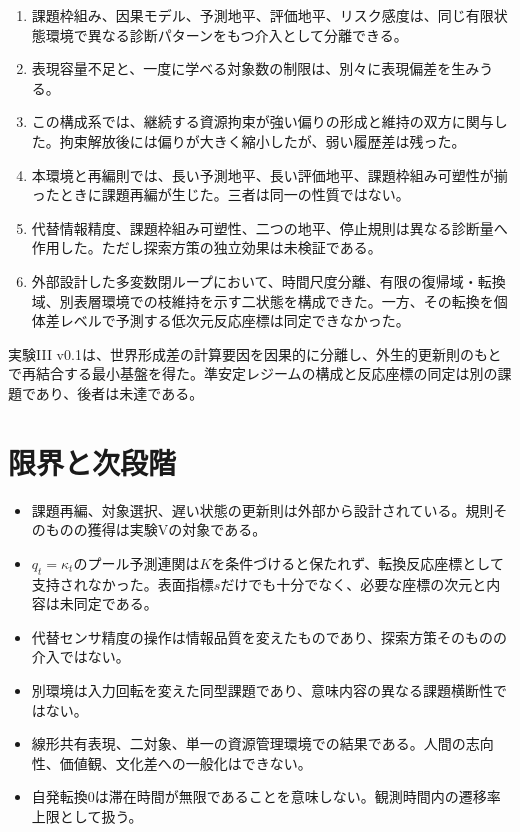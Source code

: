 \documentclass[11pt,a4paper]{ltjsarticle}
\begin{document}
\begin{enumerate}
\item 課題枠組み、因果モデル、予測地平、評価地平、リスク感度は、同じ有限状態環境で異なる診断パターンをもつ介入として分離できる。
\item 表現容量不足と、一度に学べる対象数の制限は、別々に表現偏差を生みうる。
\item この構成系では、継続する資源拘束が強い偏りの形成と維持の双方に関与した。拘束解放後には偏りが大きく縮小したが、弱い履歴差は残った。
\item 本環境と再編則では、長い予測地平、長い評価地平、課題枠組み可塑性が揃ったときに課題再編が生じた。三者は同一の性質ではない。
\item 代替情報精度、課題枠組み可塑性、二つの地平、停止規則は異なる診断量へ作用した。ただし探索方策の独立効果は未検証である。
\item 外部設計した多変数閉ループにおいて、時間尺度分離、有限の復帰域・転換域、別表層環境での枝維持を示す二状態を構成できた。一方、その転換を個体差レベルで予測する低次元反応座標は同定できなかった。
\end{enumerate}

\enlargethispage{2\baselineskip}
実験III v0.1は、世界形成差の計算要因を因果的に分離し、外生的更新則のもとで再結合する最小基盤を得た。準安定レジームの構成と反応座標の同定は別の課題であり、後者は未達である。

\section{限界と次段階}

\begin{itemize}
\item 課題再編、対象選択、遅い状態の更新則は外部から設計されている。規則そのものの獲得は実験Vの対象である。
\item $q_t=\kappa_t$のプール予測連関は$K$を条件づけると保たれず、転換反応座標として支持されなかった。表面指標$s$だけでも十分でなく、必要な座標の次元と内容は未同定である。
\item 代替センサ精度の操作は情報品質を変えたものであり、探索方策そのものの介入ではない。
\item 別環境は入力回転を変えた同型課題であり、意味内容の異なる課題横断性ではない。
\item 線形共有表現、二対象、単一の資源管理環境での結果である。人間の志向性、価値観、文化差への一般化はできない。
\item 自発転換0は滞在時間が無限であることを意味しない。観測時間内の遷移率上限として扱う。
\end{itemize}
\end{document}
